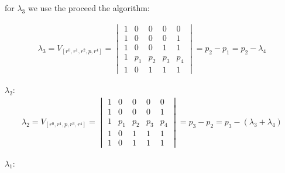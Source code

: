 		for $\lambda_3$ we use the proceed the algorithm:
		
		\begin{equation}
		\begin{align*}
			\lambda_3 =	V_{[r^0,r^1,r^2,p,r^4]} = 
			\begin{vmatrix}
				1 & 0 & 0 & 0 & 0\\ 
				1 & 0 & 0 & 0 & 1\\ 
				1 &  0  & 0 & 1 & 1 \\ 
				1 & p_{1} &  p_{2}& p_{3} & p_{4}\\
				1 & 0 & 1 & 1 & 1
				\end{vmatrix} = p_2 - p_1 = p_2 - \lambda_4
		\end{align*}
		\end{equation}
		
		
		$\lambda_2$:\\
		
		\begin{equation}
		\begin{align*}
			\lambda_2 =	V_{[r^0,r^1,p,r^3,r^4]} = 
			\begin{vmatrix}
				1 & 0 & 0 & 0 & 0\\ 
				1 & 0 & 0 & 0 & 1\\ 
				1 & p_{1} &  p_{2}& p_{3} & p_{4}\\
				1 &  0  & 1 & 1 & 1 \\ 
				1 & 0 & 1 & 1 & 1
				\end{vmatrix} = p_3 - p_2 = p_3 - (\lambda_3 + \lambda_4)
		\end{align*}				
		\end{equation}	
		
		
		$\lambda_1$:\\
		
